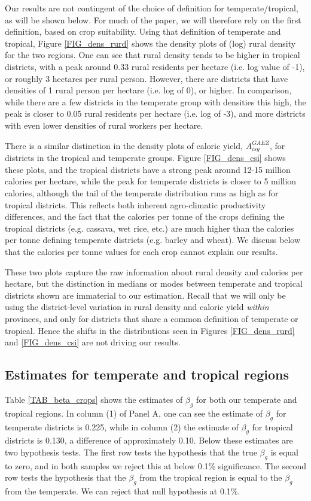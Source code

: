 \documentclass[11pt]{article}
\begin{document}
Our results are not contingent of the choice of definition for temperate/tropical, as will be shown below. For much of the paper, we will therefore rely on the first definition, based on crop suitability. Using that definition of temperate and tropical, Figure \ref{FIG_dens_rurd} shows the density plots of (log) rural density for the two regions. One can see that rural density tends to be higher in tropical districts, with a peak around 0.33 rural residents per hectare (i.e. log value of -1), or roughly 3 hectares per rural person. However, there are districts that have densities of 1 rural person per hectare (i.e. log of 0), or higher. In comparison, while there are a few districts in the temperate group with densities this high, the peak is closer to 0.05 rural residents per hectare (i.e. log of -3), and more districts with even lower densities of rural workers per hectare. 

There is a similar distinction in the density plots of caloric yield, $A_{isg}^{GAEZ}$, for districts in the tropical and temperate groups. Figure \ref{FIG_dens_csi} shows these plots, and the tropical districts have a strong peak around 12-15 million calories per hectare, while the peak for temperate districts is closer to 5 million calories, although the tail of the temperate distribution runs as high as for tropical districts. This reflects both inherent agro-climatic productivity differences, and the fact that the calories per tonne of the crops defining the tropical districts (e.g. cassava, wet rice, etc.) are much higher than the calories per tonne defining temperate districts (e.g. barley and wheat). We discuss below that the calories per tonne values for each crop cannot explain our results.

These two plots capture the raw information about rural density and calories per hectare, but the distinction in medians or modes between temperate and tropical districts shown are immaterial to our estimation. Recall that we will only be using the district-level variation in rural density and caloric yield \textit{within} provinces, and only for districts that share a common definition of temperate or tropical. Hence the shifts in the distributions seen in Figures \ref{FIG_dens_rurd} and \ref{FIG_dens_csi} are not driving our results. 

\subsection{Estimates for temperate and tropical regions}
Table \ref{TAB_beta_crops} shows the estimates of $\beta_g$ for both our temperate and tropical regions. In column (1) of Panel A, one can see the estimate of $\beta_g$ for temperate districts is 0.225, while in column (2) the estimate of $\beta_g$ for tropical districts is 0.130, a difference of approximately 0.10. Below these estimates are two hypothesis tests. The first row tests the hypothesis that the true $\beta_g$ is equal to zero, and in both samples we reject this at below 0.1\% significance. The second row tests the hypothesis that the $\beta_g$ from the tropical region is equal to the $\beta_g$ from the temperate. We can reject that null hypothesis at 0.1\%.
\end{document}
